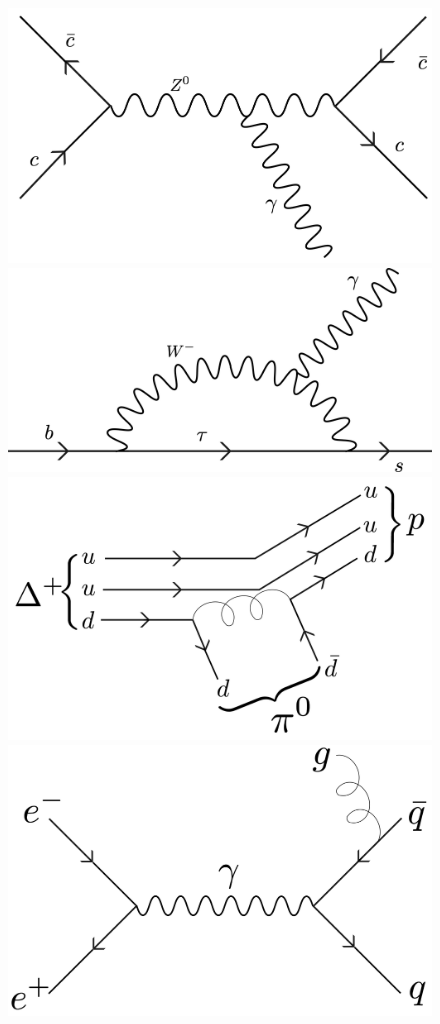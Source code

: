 \begin{figure}[hbtp]
    \centering
    \includegraphics[scale=0.05]{Feynman/cc-_cc-01.jpg}
    \includegraphics[scale=0.2]{Feynman/decaycircular.jpg}
    \includegraphics[scale=0.05]{Feynman/Delta+-01.jpg}
    \includegraphics[scale=0.05]{Feynman/eeqq-01.jpg}

\end{figure}
